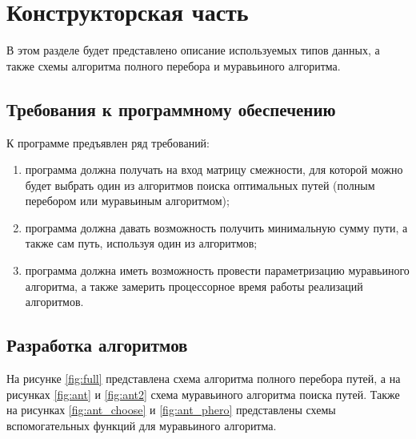 \chapter{Конструкторская часть}
В этом разделе будет представлено описание используемых типов данных, а также схемы алгоритма полного перебора и муравьиного алгоритма.

\section{Требования к программному обеспечению}

К программе предъявлен ряд требований:
\begin{enumerate}[label=\arabic*)]
	\item программа должна получать на вход матрицу смежности, для которой можно будет выбрать один из алгоритмов поиска оптимальных путей (полным перебором или муравьиным алгоритмом);
	\item программа должна давать возможность получить минимальную сумму пути, а также сам путь, используя один из алгоритмов;
	\item программа должна иметь возможность провести параметризацию муравьиного алгоритма, а также замерить процессорное время работы реализаций алгоритмов.
\end{enumerate}

\section{Разработка алгоритмов}
На рисунке \ref{fig:full} представлена схема алгоритма полного перебора путей, а на рисунках \ref{fig:ant} и \ref{fig:ant2} схема муравьиного алгоритма поиска путей. Также на рисунках \ref{fig:ant_choose} и \ref{fig:ant_phero} представлены схемы вспомогательных функций для муравьиного алгоритма.

